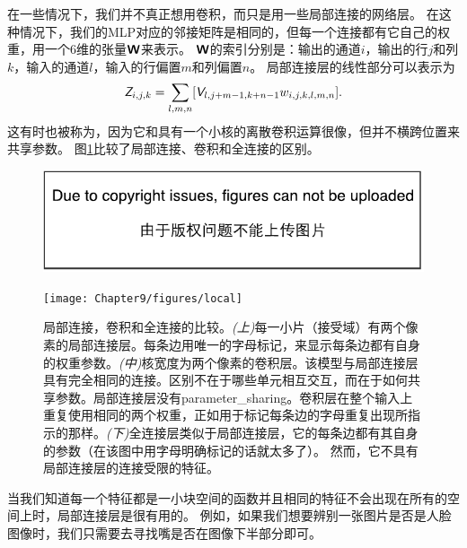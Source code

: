 

在一些情况下，我们并不真正想用卷积，而只是用一些局部连接的网络层\citep{LeCun86,LeCun89a}。
在这种情况下，我们的\gls{MLP}对应的邻接矩阵是相同的，但每一个连接都有它自己的权重，用一个6维的张量$\textsf{\textbf{W}}$来表示。
$\textsf{\textbf{W}}$的索引分别是：输出的通道$i$，输出的行$j$和列$k$，输入的通道$l$，输入的行偏置$m$和列偏置$n$。
局部连接层的线性部分可以表示为
\begin{equation}
\TEZ_{i,j,k} = \sum_{l,m,n} [\TEV_{l, j+m-1, k+n-1} w_{i, j, k, l, m, n}]. %
\end{equation}
这有时也被称为，因为它和具有一个小核的离散卷积运算很像，但并不横跨位置来共享参数。
图\ref{fig:chap9_local}比较了局部连接、卷积和全连接的区别。
\begin{figure}[!htb]
\ifOpenSource
\centerline{\includegraphics{figure.pdf}}
\else
\centerline{\texttt{[image: Chapter9/figures/local]}}
\fi
\caption{局部连接，卷积和全连接的比较。\emph{(上)}每一小片（接受域）有两个像素的局部连接层。每条边用唯一的字母标记，来显示每条边都有自身的权重参数。\emph{(中)}核宽度为两个像素的卷积层。该模型与局部连接层具有完全相同的连接。区别不在于哪些单元相互交互，而在于如何共享参数。局部连接层没有\gls{parameter_sharing}。卷积层在整个输入上重复使用相同的两个权重，正如用于标记每条边的字母重复出现所指示的那样。\emph{(下)}全连接层类似于局部连接层，它的每条边都有其自身的参数（在该图中用字母明确标记的话就太多了）。 然而，它不具有局部连接层的连接受限的特征。}
\label{fig:chap9_local}
\end{figure}
 
 
当我们知道每一个特征都是一小块空间的函数并且相同的特征不会出现在所有的空间上时，局部连接层是很有用的。
例如，如果我们想要辨别一张图片是否是人脸图像时，我们只需要去寻找嘴是否在图像下半部分即可。

